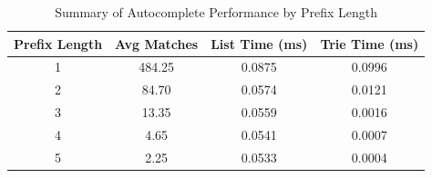 \documentclass{article}
\begin{document}
\vspace{0.5cm}

\begin{table}[H]
    \centering
    \begin{tabular}{cccc}
        \toprule
        \textbf{Prefix Length} & \textbf{Avg Matches} & \textbf{List Time (ms)} & \textbf{Trie Time (ms)} \\
        \midrule
        1 & 484.25 & 0.0875 & 0.0996 \\
        2 & 84.70 & 0.0574 & 0.0121 \\
        3 & 13.35 & 0.0559 & 0.0016 \\
        4 & 4.65 & 0.0541 & 0.0007 \\
        5 & 2.25 & 0.0533 & 0.0004 \\
        \bottomrule
    \end{tabular}
    \caption{Summary of Autocomplete Performance by Prefix Length}
    \label{tab:exp_data}
\end{table}
\end{document}

